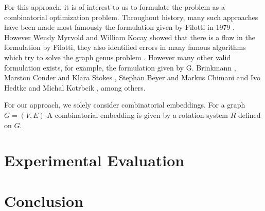 \documentclass{article}
\newcommand{\classX}[1]{\ensuremath{\text{\textsf{\textbf{#1}}}}}
\newcommand{\classP}{\classX{P}}
\newcommand{\classNP}{\classX{NP}}
\begin{document}
    For this approach, it is of interest to us to formulate the problem as a combinatorial optimization problem. 
    Throughout history, many such approaches have been made most famously the formulation given by Filotti in 1979 \cite{Filotti79}. However Wendy Myrvold and William Kocay showed that there is a flaw in the formulation by Filotti, they also identified errors in many famous algorithms which try to solve the graph genus problem \cite{Myrvold11}.
    However many other valid formulation exists, for example, the formulation given by G. Brinkmann \cite{brinkmann20}, Marston Conder and Klara Stokes \cite{Conder19}, Stephan Beyer and Markus Chimani and Ivo Hedtke and Michal Kotrbcik \cite{Beyer16}, among others.
    
    For our approach, we solely consider combinatorial embeddings. For a graph $G = (V, E)$
    A combinatorial embedding is given by a rotation system $R$ defined on $G$.

\section{Experimental Evaluation}\label{sec: exp}

\section{Conclusion}\label{sec: con}


    
    
\end{document}
